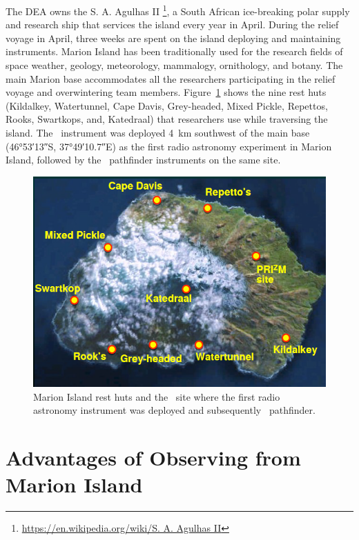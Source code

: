 The DEA owns the S. A. Agulhas II \footnote{\url{https://en.wikipedia.org/wiki/S. A. Agulhas II}}, a South African ice-breaking polar supply and research ship that services the island every year in April. During the relief voyage in April, three weeks are spent on the island deploying and maintaining instruments. Marion Island has been traditionally used for the research fields of space weather, geology, meteorology, mammalogy, ornithology, and botany. The main Marion base accommodates all the researchers participating in the relief voyage and overwintering team members. Figure~\ref{fig:site} shows the nine rest huts (Kildalkey, Watertunnel, Cape Davis, Grey-headed, Mixed Pickle, Repettos, Rooks, Swartkops, and, Katedraal) that researchers use while traversing the island. The \prizm\ instrument was deployed \SI{4}{\kilo \meter} southwest of the main base (\ang{46;53;13}S, \ang{37;49;10.7}E) as the first radio astronomy experiment in Marion Island, followed by the \albatros\ pathfinder instruments on the same site. 

\begin{figure}
	\centering
	\includegraphics[width=\linewidth]{Figures/site}
	\caption{Marion Island rest huts and the \prizm\ site where the first radio astronomy instrument was deployed and subsequently \albatros\ pathfinder.}
	\label{fig:site}
\end{figure}

\section{Advantages of Observing from Marion Island}

